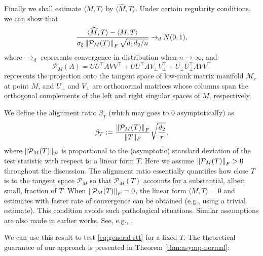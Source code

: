 \documentclass[12pt]{article}
\newcommand{\tF}{{\rm F}}
\newcommand{\norm}[1]{\left\lVert#1\right\rVert}
\newcommand{\cP}{\mathcal{P}}
\def\calM{{\mathcal M}}
\theoremstyle{plain}
\begin{document}
\begin{sloppypar}
{Finally we shall estimate $\langle M, T\rangle$ by $\langle \widehat{M}, T\rangle$. Under certain regularity conditions, we can show that
\begin{equation}\label{eq:clt-tangent}
\frac{\langle \widehat{M}, T\rangle-\langle M, T\rangle}{\sigma_\xi\norm{\cP_M(T)}_{\tF}\sqrt{d_1d_2/n}}\to_d N(0,1),
\end{equation}
where $\to_d$  represents convergence in distribution when $n\to \infty$, and
\begin{equation}\label{eq:tangent-proj}
    \cP_M(A)=UU^\top AVV^\top+UU^\top AV_\perp V_\perp^\top+U_\perp U_\perp^\top AVV^\top
\end{equation}
represents the projection onto the tangent space of low-rank matrix manifold $\calM_r$ at point $M$, and $U_\perp$ and $V_\perp$ are orthonormal matrices whose columns span the orthogonal complements of the left and right singular spaces of $M$, respectively. 


We define the alignment ratio $\beta_T$ (which may goes to $0$ asymptotically) as
\begin{equation}\label{eq:alignment}
	\beta_T := \frac{\norm{\cP_M(T)}_\tF}{\|T\|_{\rm F}} \sqrt{\frac{d_2}{r} },
\end{equation} 
where $\norm{\cP_M(T)}_\tF$ is proportional to the (asymptotic) standard deviation of the test statistic with respect to a linear form $T$.  Here we assume $\norm{\cP_M(T)}_\tF>0$ throughout the discussion. The alignment ratio essentially quantifies how close $T$ is to the tangent space $\cP_M$ so that $\cP_{M}(T)$ accounts for a substantial, albeit small, fraction of $T$. When $\norm{\cP_M(T)}_\tF=0$, the linear form $\langle M, T\rangle=0$ and estimates with faster rate of convergence can be obtained (e.g., using a trivial estimate). This condition avoids such pathological situations. Similar assumptions are also made in earlier works. See, e.g., \cite{chen2019inference,xia2021statistical}.   

We can use this result to test \eqref{eq:general-rtt} for a fixed $T$. The theoretical guarantee of our approach is presented in Theorem \ref{thm:asymp-normal}:


}
\end{sloppypar}
\end{document}

